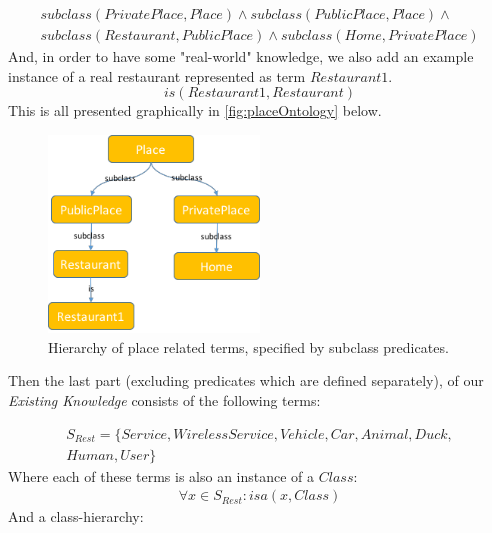\begin{equation}\label{as:kbPlaceSubclasses}
\begin{gathered}
    subclass(PrivatePlace,Place) \land subclass(PublicPlace,Place) \land \\
	subclass(Restaurant,PublicPlace) \land subclass(Home,PrivatePlace)
\end{gathered}
\end{equation}
And, in order to have some "real-world" knowledge, we also add an example 
instance of a real restaurant represented as term $Restaurant1$.
\begin{equation}\label{as:restaurant1}
	is(Restaurant1,Restaurant)
\end{equation}
This is all presented graphically in \autoref{fig:placeOntology} below.
\begin{figure}[H]
	\centering
		\includegraphics[width=0.5\textwidth]{figures/placeOntology.png}
	\caption{Hierarchy of place related terms, specified by subclass predicates.}
	\label{fig:placeOntology}
\end{figure}

Then the last part (excluding predicates which are defined separately),
of our \emph{Existing Knowledge} consists of the following terms:

\begin{equation}\label{set:otherTerms}
\begin{gathered}
S_{Rest} = \{Service,WirelessService,Vehicle,Car,Animal,Duck,\\
	Human,User\}
\end{gathered}
\end{equation}
Where each of these terms is also an instance of a $Class$:
\begin{equation}\label{set:restTermsClass}
\begin{gathered}
\forall x \in S_{Rest}: isa(x,Class)
\end{gathered}
\end{equation}
And a class-hierarchy:

